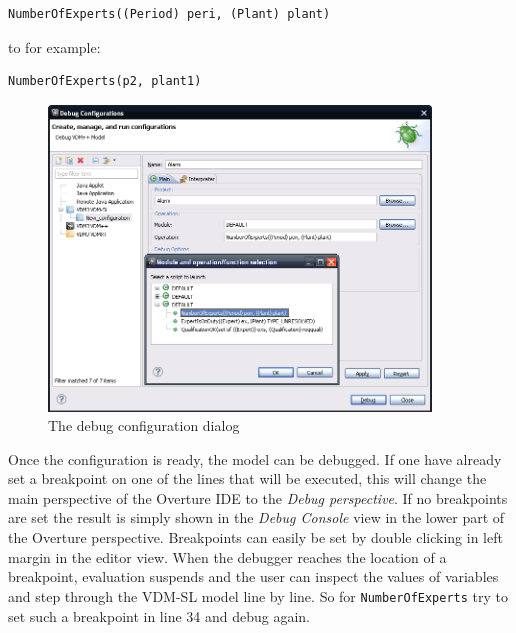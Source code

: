 {\begin{lstlisting}
NumberOfExperts((Period) peri, (Plant) plant)
\end{lstlisting}
\noindent to for example:
\begin{lstlisting}
NumberOfExperts(p2, plant1)
\end{lstlisting}

\begin{figure}[htp]
\begin{center}
  \includegraphics[width=4in]{figures/DebugConfiguration}
  \caption{The debug configuration dialog}
  \label{fig:debugConfiguration}
\end{center}
\end{figure}

Once the configuration is ready, the model can be debugged. If one
have already set a breakpoint on one of the lines that will be
executed, this will
change the main perspective of the Overture IDE to the \emph{Debug
  perspective}. If no breakpoints are set the result is simply shown
in the \emph{Debug Console} view in the lower part of the Overture
perspective. Breakpoints can easily be set by double clicking in
left margin in the editor view. When the debugger reaches the location
of a breakpoint, evaluation suspends and the user can inspect the
values of variables and step through the VDM-SL model line by line. So
for \texttt{NumberOfExperts} try to set such a breakpoint in line 34
and debug again.
 
}
